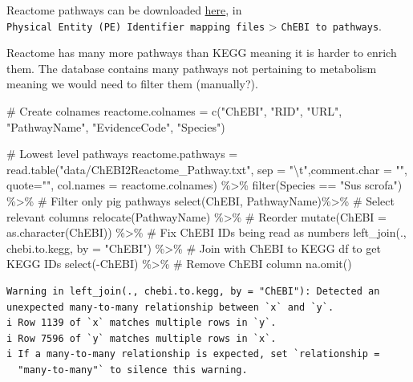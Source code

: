 \documentclass[
  24px,
  letterpaper,
  DIV=11,
  numbers=noendperiod]{scrartcl}
\newenvironment{Shaded}{\begin{snugshade}}{\end{snugshade}}
\newcommand{\AttributeTok}[1]{\textcolor[rgb]{0.40,0.45,0.13}{#1}}
\newcommand{\CommentTok}[1]{\textcolor[rgb]{0.37,0.37,0.37}{#1}}
\newcommand{\FunctionTok}[1]{\textcolor[rgb]{0.28,0.35,0.67}{#1}}
\newcommand{\NormalTok}[1]{\textcolor[rgb]{0.00,0.23,0.31}{#1}}
\newcommand{\OtherTok}[1]{\textcolor[rgb]{0.00,0.23,0.31}{#1}}
\newcommand{\SpecialCharTok}[1]{\textcolor[rgb]{0.37,0.37,0.37}{#1}}
\newcommand{\StringTok}[1]{\textcolor[rgb]{0.13,0.47,0.30}{#1}}
\begin{document}
Reactome pathways can be downloaded
\href{https://reactome.org/download-data}{here}, in
\texttt{Physical\ Entity\ (PE)\ Identifier\ mapping\ files}
\textgreater{} \texttt{ChEBI\ to\ pathways}.

Reactome has many more pathways than KEGG meaning it is harder to enrich
them. The database contains many pathways not pertaining to metabolism
meaning we would need to filter them (manually?).

\begin{Shaded}
\begin{Highlighting}[]
\CommentTok{\# Create colnames}
\NormalTok{reactome.colnames }\OtherTok{=} \FunctionTok{c}\NormalTok{(}\StringTok{"ChEBI"}\NormalTok{, }\StringTok{"RID"}\NormalTok{, }\StringTok{"URL"}\NormalTok{, }\StringTok{"PathwayName"}\NormalTok{, }\StringTok{"EvidenceCode"}\NormalTok{, }\StringTok{"Species"}\NormalTok{)}

\CommentTok{\# Lowest level pathways}
\NormalTok{reactome.pathways }\OtherTok{=} \FunctionTok{read.table}\NormalTok{(}\StringTok{"data/ChEBI2Reactome\_Pathway.txt"}\NormalTok{, }\AttributeTok{sep =} \StringTok{"}\SpecialCharTok{\textbackslash{}t}\StringTok{"}\NormalTok{,}\AttributeTok{comment.char =} \StringTok{""}\NormalTok{, }\AttributeTok{quote=}\StringTok{""}\NormalTok{, }\AttributeTok{col.names =}\NormalTok{ reactome.colnames) }\SpecialCharTok{\%\textgreater{}\%} 
  \FunctionTok{filter}\NormalTok{(Species }\SpecialCharTok{==} \StringTok{"Sus scrofa"}\NormalTok{) }\SpecialCharTok{\%\textgreater{}\%} \CommentTok{\# Filter only pig pathways}
  \FunctionTok{select}\NormalTok{(ChEBI, PathwayName)}\SpecialCharTok{\%\textgreater{}\%} \CommentTok{\# Select relevant columns}
  \FunctionTok{relocate}\NormalTok{(PathwayName) }\SpecialCharTok{\%\textgreater{}\%} \CommentTok{\# Reorder}
  \FunctionTok{mutate}\NormalTok{(}\AttributeTok{ChEBI =} \FunctionTok{as.character}\NormalTok{(ChEBI)) }\SpecialCharTok{\%\textgreater{}\%} \CommentTok{\# Fix ChEBI IDs being read as numbers}
  \FunctionTok{left\_join}\NormalTok{(., chebi.to.kegg, }\AttributeTok{by =} \StringTok{"ChEBI"}\NormalTok{) }\SpecialCharTok{\%\textgreater{}\%} \CommentTok{\# Join with ChEBI to KEGG df to get KEGG IDs}
  \FunctionTok{select}\NormalTok{(}\SpecialCharTok{{-}}\NormalTok{ChEBI) }\SpecialCharTok{\%\textgreater{}\%} \CommentTok{\# Remove ChEBI column}
  \FunctionTok{na.omit}\NormalTok{()}
\end{Highlighting}
\end{Shaded}

\begin{verbatim}
Warning in left_join(., chebi.to.kegg, by = "ChEBI"): Detected an unexpected many-to-many relationship between `x` and `y`.
i Row 1139 of `x` matches multiple rows in `y`.
i Row 7596 of `y` matches multiple rows in `x`.
i If a many-to-many relationship is expected, set `relationship =
  "many-to-many"` to silence this warning.
\end{verbatim}
\end{document}
